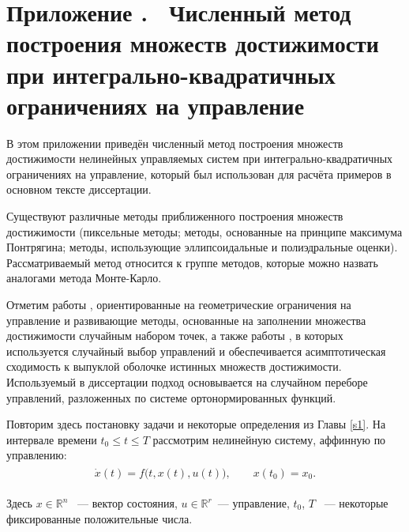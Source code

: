 \documentclass[../main.tex]{subfiles}
\begin{document}
\clearpage
\setcounter{section}{0}%
\renewcommand{\thesection}{\Alph{section}}%
\section*{Приложение .  Численный метод построения множеств достижимости при интегрально-квадратичных ограничениях на управление}%
\label{app:A}%
\renewcommand{\theequation}{\Alph{section}.\arabic{equation}}%
\setcounter{equation}{0}
В этом приложении приведён численный метод построения множеств достижимости нелинейных управляемых систем при интегрально-квадратичных ограничениях на управление, который был использован для расчёта примеров в основном тексте диссертации.

Существуют различные методы приближенного построения множеств достижимости (пиксельные методы; методы, основанные на принципе максимума Понтрягина; методы, использующие эллипсоидальные и полиэдральные оценки).
Рассматриваемый метод относится к группе методов, которые можно назвать аналогами метода Монте-Карло. 
 
Отметим работы \cite{Gornov2015, Gornov2017}, ориентированные на геометрические ограничения на управление и развивающие методы, основанные на заполнении множества достижимости случайным набором точек, а также работы \cite{Lew2020, Lew2022}, в которых используется случайный выбор управлений и обеспечивается асимптотическая сходимость к выпуклой оболочке истинных множеств достижимости.
Используемый в диссертации подход основывается на случайном переборе управлений, разложенных по системе ортонормированных функций.

Повторим здесь постановку задачи и некоторые определения из Главы \ref{s1}.
На интервале времени $ t_0 \leqslant t \leqslant {T} $ рассмотрим нелинейную систему, аффинную по управлению:
\begin{gather}\label{a1:common_nonlinear}
	\begin{gathered}
		\dot{x}(t)=f\big(t, x(t), u(t)\big), \qquad x(t_0) = x_0.
	\end{gathered}
\end{gather}

Здесь $ x \in \mathbb{R}^n $ ~--- вектор состояния, $ u \in \mathbb{R}^r $~--- управление, $t_0$, $ {T} $ ~--- некоторые фиксированные положительные числа.
\end{document}
